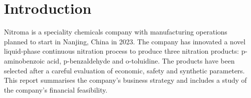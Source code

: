 \section{Introduction}
Nitroma is a speciality chemicals company with manufacturing operations planned to start in Nanjing, China in 2023. The company has innovated a novel liquid-phase continuous nitration process to produce three nitration products: p-aminobenzoic acid, p-benzaldehyde and o-toluidine. The products have been selected after a careful evaluation of economic, safety and synthetic parameters. This report summarises the company’s business strategy and includes a study of the company’s financial feasibility. 